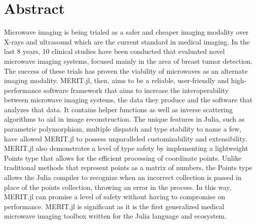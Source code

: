 \chapter*{Abstract}
Microwave imaging is being trialed as a safer and cheaper imaging modality over X-rays and ultrasound which are the
current standard in medical imaging. In the last 8 years, 10 clinical studies have been conducted that evaluated novel
microwave imaging systems, focused mainly in the area of breast tumor detection. The success of these trials has proven
the viability of microwaves as an alternate imaging modality. MERIT.jl, then, aims to be a reliable, user-friendly and
high-performance software framework that aims to increase the interoperability between microwave imaging systems, the
data they produce and the software that analyzes that data. It contains helper functions as well as inverse scattering
algorithms to aid in image reconstruction. The unique features in Julia, such as parametric polymorphism, multiple
dispatch and type stability to name a few, have allowed MERIT.jl to possess unparalleled customizability and
extensibility. MERIT.jl also demonstrates a level of type safety by implementing a lightweight Points type that allows
for the efficient processing of coordinate points. Unlike traditional methods that represent points as a matrix of
numbers, the Points type allows the Julia compiler to recognize when an incorrect collection is passed in place of the
points collection, throwing an error in the process. In this way, MERIT.jl can promise a level of safety without having
to compromise on performance. MERIT.jl is significant as it is the first generalized medical microwave imaging toolbox
written for the Julia language and ecosystem. 
\newpage
